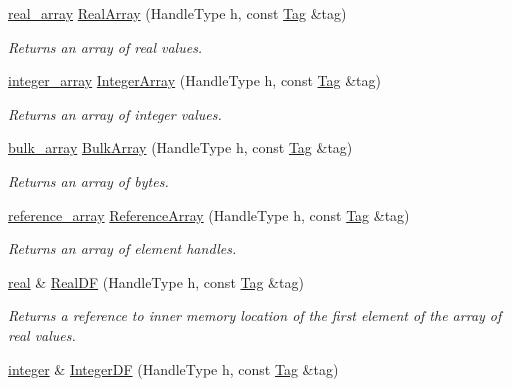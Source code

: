 \begin{DoxyCompactItemize}
\hyperlink{classINMOST_1_1Storage_a430e5358d435befb38169beef593527e}{real\-\_\-array} \hyperlink{classINMOST_1_1Mesh_a06bdd4e7c0d26750ca0aa40e03fc7d4c}{Real\-Array} (Handle\-Type h, const \hyperlink{classINMOST_1_1Tag}{Tag} \&tag)
\begin{DoxyCompactList}\small\item\em Returns an array of real values. \end{DoxyCompactList}\item 
\hyperlink{classINMOST_1_1Storage_a4d1637367f0487eb778894b57fc94647}{integer\-\_\-array} \hyperlink{classINMOST_1_1Mesh_ac0bbbfafae1405bd27b726bdbb4c2cdd}{Integer\-Array} (Handle\-Type h, const \hyperlink{classINMOST_1_1Tag}{Tag} \&tag)
\begin{DoxyCompactList}\small\item\em Returns an array of integer values. \end{DoxyCompactList}\item 
\hyperlink{classINMOST_1_1Storage_a6e49b2a38cb55dd59529bd23e8b1b852}{bulk\-\_\-array} \hyperlink{classINMOST_1_1Mesh_ae496bab413c4a6103ee62ae3903e95fe}{Bulk\-Array} (Handle\-Type h, const \hyperlink{classINMOST_1_1Tag}{Tag} \&tag)
\begin{DoxyCompactList}\small\item\em Returns an array of bytes. \end{DoxyCompactList}\item 
\hyperlink{classINMOST_1_1Storage_1_1reference__array}{reference\-\_\-array} \hyperlink{classINMOST_1_1Mesh_ac211da4cbe1dc33394c9b725b64b1e86}{Reference\-Array} (Handle\-Type h, const \hyperlink{classINMOST_1_1Tag}{Tag} \&tag)
\begin{DoxyCompactList}\small\item\em Returns an array of element handles. \end{DoxyCompactList}\item 
\hyperlink{classINMOST_1_1Storage_a853346784b4a5822a7fac54d8f10f805}{real} \& \hyperlink{classINMOST_1_1Mesh_a90e88bbdedcf71c3226f3dc94da66807}{Real\-D\-F} (Handle\-Type h, const \hyperlink{classINMOST_1_1Tag}{Tag} \&tag)
\begin{DoxyCompactList}\small\item\em Returns a reference to inner memory location of the first element of the array of real values. \end{DoxyCompactList}\item 
\hyperlink{classINMOST_1_1Storage_aec96942bc647417a801e2895b45964d2}{integer} \& \hyperlink{classINMOST_1_1Mesh_a3dd3068d4db02871478bea86fce38945}{Integer\-D\-F} (Handle\-Type h, const \hyperlink{classINMOST_1_1Tag}{Tag} \&tag)

\end{DoxyCompactItemize}

